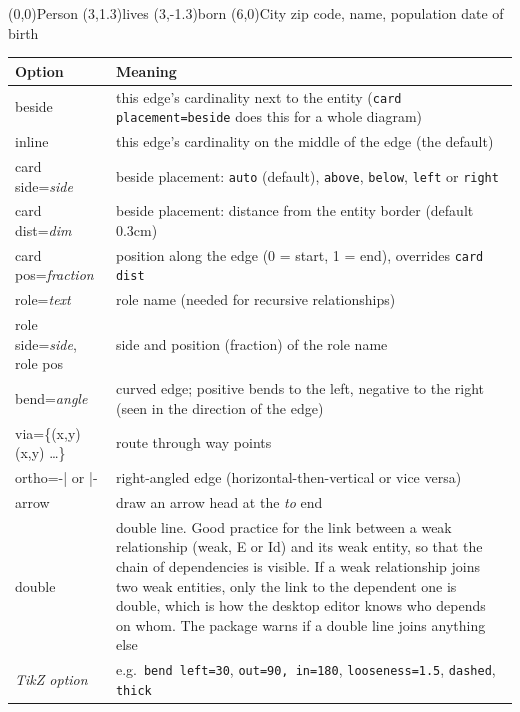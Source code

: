 \documentclass[10pt,a4paper]{article}
\newcommand\meta[1]{\textlangle\textit{#1}\textrangle}
\begin{document}
\begin{example}
\begin{erdiagram}[card placement=beside,
                  max width=\linewidth]
  (0,0){Person}
  (3,1.3){lives}
  (3,-1.3){born}
  (6,0){City}
    {zip code, name, population}
    {date of birth}
\end{erdiagram}
\end{example}

\begin{longtable}{@{}>{\ttfamily}p{3.6cm}p{12.2cm}@{}}
\toprule
\normalfont\textbf{Option} & \textbf{Meaning}\\\midrule
beside & this edge's cardinality next to the entity
  (\texttt{card placement=beside} does this for a whole diagram)\\
inline & this edge's cardinality on the middle of the edge (the default)\\
card side=\meta{side} & beside placement: \texttt{auto} (default),
  \texttt{above}, \texttt{below}, \texttt{left} or \texttt{right}\\
card dist=\meta{dim} & beside placement: distance from the entity border
  (default 0.3cm)\\
card pos=\meta{fraction} & position along the edge (0 = start, 1 = end),
  overrides \texttt{card dist}\\
role=\meta{text} & role name (needed for recursive relationships)\\
role side=\meta{side}, role pos & side and position (fraction) of the
  role name\\
bend=\meta{angle} & curved edge; positive bends to the left, negative to
  the right (seen in the direction of the edge)\\
via=\{(x,y) (x,y) \dots\} & route through way points\\
ortho=-| \textrm{or} |- & right-angled edge (horizontal-then-vertical or
  vice versa)\\
arrow & draw an arrow head at the \meta{to} end\\
double & double line. Good practice for the link between a weak
  relationship (weak, E or Id) and its weak entity, so that the chain of
  dependencies is visible. If a weak relationship joins two weak entities, only the link to
  the dependent one is double, which is how the desktop editor knows who depends on whom.
  The package warns if a double line joins
  anything else\\
\meta{TikZ option} & e.g.\ \texttt{bend left=30}, \texttt{out=90, in=180},
  \texttt{looseness=1.5}, \texttt{dashed}, \texttt{thick}\\
\bottomrule
\end{longtable}
\end{document}
